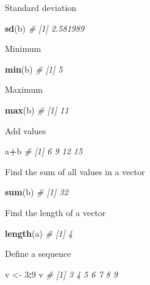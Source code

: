 \documentclass[
]{book}
\newenvironment{Shaded}{\begin{snugshade}}{\end{snugshade}}
\newcommand{\CommentTok}[1]{\textcolor[rgb]{0.56,0.35,0.01}{\textit{#1}}}
\newcommand{\DecValTok}[1]{\textcolor[rgb]{0.00,0.00,0.81}{#1}}
\newcommand{\FunctionTok}[1]{\textcolor[rgb]{0.13,0.29,0.53}{\textbf{#1}}}
\newcommand{\NormalTok}[1]{#1}
\newcommand{\OtherTok}[1]{\textcolor[rgb]{0.56,0.35,0.01}{#1}}
\newcommand{\SpecialCharTok}[1]{\textcolor[rgb]{0.81,0.36,0.00}{\textbf{#1}}}
\begin{document}
Standard deviation

\begin{Shaded}
\begin{Highlighting}[]
\FunctionTok{sd}\NormalTok{(b)}
\CommentTok{\# [1] 2.581989}
\end{Highlighting}
\end{Shaded}

Minimum

\begin{Shaded}
\begin{Highlighting}[]
\FunctionTok{min}\NormalTok{(b)}
\CommentTok{\# [1] 5}
\end{Highlighting}
\end{Shaded}

Maximum

\begin{Shaded}
\begin{Highlighting}[]
\FunctionTok{max}\NormalTok{(b)}
\CommentTok{\# [1] 11}
\end{Highlighting}
\end{Shaded}

Add values

\begin{Shaded}
\begin{Highlighting}[]
\NormalTok{a}\SpecialCharTok{+}\NormalTok{b}
\CommentTok{\# [1]  6  9 12 15}
\end{Highlighting}
\end{Shaded}

Find the sum of all values in a vector

\begin{Shaded}
\begin{Highlighting}[]
\FunctionTok{sum}\NormalTok{(b)}
\CommentTok{\# [1] 32}
\end{Highlighting}
\end{Shaded}

Find the length of a vector

\begin{Shaded}
\begin{Highlighting}[]
\FunctionTok{length}\NormalTok{(a)}
\CommentTok{\# [1] 4}
\end{Highlighting}
\end{Shaded}

Define a sequence

\begin{Shaded}
\begin{Highlighting}[]
\NormalTok{v }\OtherTok{\textless{}{-}} \DecValTok{3}\SpecialCharTok{:}\DecValTok{9}
\NormalTok{v}
\CommentTok{\# [1] 3 4 5 6 7 8 9}
\end{Highlighting}
\end{Shaded}
\end{document}
